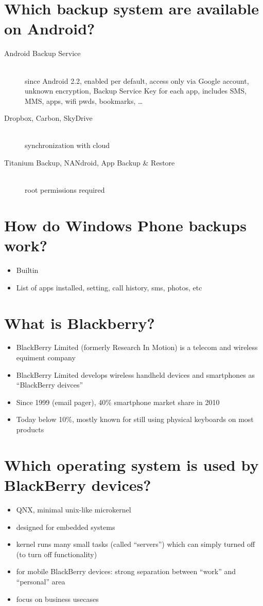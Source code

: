 \documentclass[twocolumn]{article}
\newcommand{\question}[1]{\section{#1}}
\begin{document}
\question{Which backup system are available on Android?}
%
\begin{description}
  \item[Android Backup Service]\hfill{}\\ since Android 2.2, enabled per default, access only via Google account, unknown encryption, Backup Service Key for each app, includes SMS, MMS, apps, wifi pwds, bookmarks, \dots
  \item[Dropbox, Carbon, SkyDrive]\hfill{}\\ synchronization with cloud
  \item[Titanium Backup, NANdroid, App Backup \& Restore]\hfill{}\\ root permissions required
\end{description}

\question{How do Windows Phone backups work?}
%
\begin{itemize}
  \item Builtin
  \item List of apps installed, setting, call history, sms, photos, etc
\end{itemize}

\question{What is Blackberry?}
%
\begin{itemize}
  \item BlackBerry Limited (formerly Research In Motion) is a telecom and wireless equiment company
  \item BlackBerry Limited develops wireless handheld devices and smartphones as ``BlackBerry deivces''
  \item Since 1999 (email pager), 40\% smartphone market share in 2010
  \item Today below 10\%, mostly known for still using physical keyboards on most products
\end{itemize}

\question{Which operating system is used by BlackBerry devices?}
%
\begin{itemize}
  \item QNX, minimal unix-like microkernel
  \item designed for embedded systems
  \item kernel runs many small tasks (called ``servers'') which can simply turned off (to turn off functionality)
  \item for mobile BlackBerry devices: strong separation between ``work'' and ``personal'' area
  \item focus on business usecases
\end{itemize}
\end{document}
